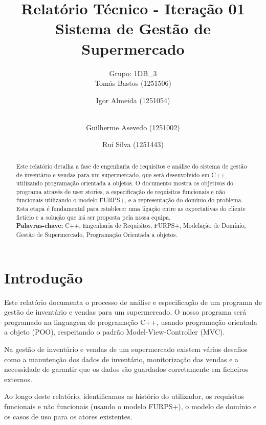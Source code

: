 \documentclass[a4paper]{llncs}
\begin{document}
\mainmatter

\title{Relatório Técnico - Iteração 01\\Sistema de Gestão de Supermercado}

\author{Grupo: 1DB\_3 \\
Tomás Bastos (1251506) \and Igor Almeida (1251054) \and \\
Guilherme Asevedo (1251002) \and Rui Silva (1251443)}

\maketitle

\begin{abstract}
Este relatório detalha a fase de engenharia de requisitos e análise do sistema de gestão de inventário e vendas para um supermercado, que será desenvolvido em C++ utilizando programação orientada a objetos. O documento mostra os objetivos do programa através de user stories, a especificação de requisitos funcionais e não funcionais utilizando o modelo FURPS+, e a representação do domínio do problema. Esta etapa é fundamental para establecer uma ligação entre as expectativas do cliente fictício e a solução que irá ser proposta pela nossa equipa.
\\
\textbf{Palavras-chave:} C++, Engenharia de Requisitos, FURPS+, Modelação de Domínio, Gestão de Supermercado, Programação Orientada a objetos.
\end{abstract}

\section{Introdução}
Este relatório documenta o processo de análise e especificação de um programa de gestão de inventário e vendas para um supermercado. O nosso programa será programado na linguagem de programação C++, usando programação orientada a objeto (POO), respeitando o padrão Model-View-Controller (MVC). 

Na gestão de inventário e vendas de um supermercado existem vários desafios como a manutenção dos dados de inventário, monitorização das vendas e a necessidade de garantir que os dados são guardados corretamente em ficheiros externos. 

Ao longo deste relatório, identificamos as histório do utilizador, os requisitos funcionais e não funcionais (usando o modelo FURPS+), o modelo de domínio e os casos de uso para os atores existentes. 
\end{document}
